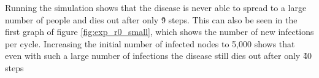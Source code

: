 Running the simulation shows that the disease is never able to spread to a large number of people and dies out after only \~9 steps. This can also be seen in the first graph of figure \ref{fig:exp_r0_small}, which shows the number of new infections per cycle. Increasing the initial number of infected nodes to 5,000 shows that even with such a large number of infections the disease still dies out after only \~40 steps



